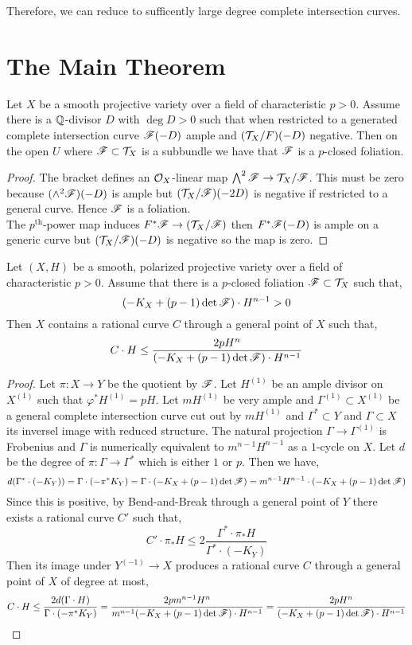 \documentclass[12pt]{article}
\begin{document}
Therefore, we can reduce to sufficently large degree complete intersection curves.


\section{The Main Theorem}

\begin{prop}
Let $X$ be a smooth projective variety over a field of characteristic $p > 0$. Assume there is a $\mathbb{Q}$-divisor $D$ with $\deg{D} > 0$ such that when restricted to a generated complete intersection curve $\mathscr{F}(-D)$ ample and $(\mathcal{T}_X/F)(-D)$ negative. Then on the open $U$ where $\mathscr{F} \subset \mathcal{T}_X$ is a subbundle we have that $\mathscr{F}$ is a $p$-closed foliation.
\end{prop}

\begin{proof}
The bracket defines an $\mathcal{O}_{X}$-linear map $\bigwedge^2 \mathscr{F} \to \mathcal{T}_X / \mathscr{F}$. This must be zero because $(\wedge^2 \mathscr{F})(-D)$ is ample but $(\mathcal{T}_X/\mathscr{F})(-2D)$ is negative if restricted to a general curve. Hence $\mathscr{F}$ is a foliation. 
\bigskip\\
The $p^{\text{th}}$-power map induces $F^* \mathscr{F} \to (\mathcal{T}_X / \mathscr{F})$ then $F^* \mathscr{F}(-D)$ is ample on a generic curve but $(\mathcal{T}_X/\mathscr{F})(-D)$ is negative so the map is zero. 
\end{proof}

\begin{theorem}
Let $(X, H)$ be a smooth, polarized projective variety over a field of characteristic $p > 0$. Assume that there is a $p$-closed foliation $\mathscr{F} \subset \mathcal{T}_X$ such that,
\[ (-K_X + (p-1) \det{\mathscr{F}}) \cdot H^{n-1} > 0 \]
Then $X$ contains a rational curve $C$ through a general point of $X$ such that,
\[ C \cdot H \le \frac{2 p H^n}{(-K_X + (p-1) \det{\mathscr{F}}) \cdot H^{n-1}} \]
\end{theorem}

\begin{proof}
Let $\pi : X \to Y$ be the quotient by $\mathscr{F}$. Let $H^{(1)}$ be an ample divisor on $X^{(1)}$ such that $\varphi^* H^{(1)} = p H$. Let $m H^{(1)}$ be very ample and $\Gamma^{(1)} \subset X^{(1)}$ be a general complete intersection curve cut out by $m H^{(1)}$ and $\Gamma^* \subset Y$ and $\Gamma \subset X$ its inversel image with reduced structure. The natural projection $\Gamma \to \Gamma^{(1)}$ is Frobenius and $\Gamma$ is numerically equivalent to $m^{n-1} H^{n-1}$ as a $1$-cycle on $X$. Let $d$ be the degree of $\pi : \Gamma \to \Gamma^*$ which is either $1$ or $p$. Then we have,
\[ d (\Gamma^* \cdot (-K_Y)) = \Gamma \cdot (-\pi^*K_Y) = \Gamma \cdot (-K_X + (p-1) \det{\mathscr{F}}) = m^{n-1} H^{n-1} \cdot (-K_X + (p-1) \det{\mathscr{F}}) \]
Since this is positive, by Bend-and-Break through a general point of $Y$ there exists a rational curve $C'$ such that,
\[ C' \cdot \pi_* H \le 2 \frac{\Gamma^* \cdot \pi_* H}{\Gamma^* \cdot (-K_Y)} \]
Then its image under $Y^{(-1)} \to X$ produces a rational curve $C$ through a general point of $X$ of degree at most,
\[ C \cdot H \le \frac{2d(\Gamma \cdot H)}{\Gamma \cdot (-\pi^* K_Y)} = \frac{2 p m^{n-1} H^n}{m^{n-1} (-K_X + (p-1) \det{\mathscr{F}}) \cdot H^{n-1}} = \frac{2 p H^n}{(-K_X + (p-1) \det{\mathscr{F}}) \cdot H^{n-1}} \]
\end{proof}
\end{document}
